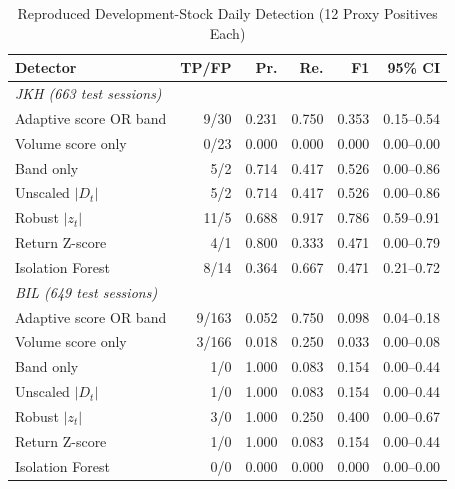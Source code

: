 \begin{table}[!t]
\caption{Reproduced Development-Stock Daily Detection (12 Proxy Positives Each)}
\label{tab:ablation}
\centering\footnotesize
\setlength{\tabcolsep}{2.7pt}
\begin{tabular}{@{}lrrrrr@{}}
\toprule
Detector & TP/FP & Pr. & Re. & F1 & 95\% CI \\
\midrule
\multicolumn{6}{l}{\textit{JKH (663 test sessions)}}\\
Adaptive score OR band & 9/30 & 0.231 & 0.750 & 0.353 & 0.15--0.54 \\
Volume score only & 0/23 & 0.000 & 0.000 & 0.000 & 0.00--0.00 \\
Band only & 5/2 & 0.714 & 0.417 & 0.526 & 0.00--0.86 \\
Unscaled $|D_t|$ & 5/2 & 0.714 & 0.417 & 0.526 & 0.00--0.86 \\
Robust $|z_t|$ & 11/5 & 0.688 & 0.917 & 0.786 & 0.59--0.91 \\
Return Z-score & 4/1 & 0.800 & 0.333 & 0.471 & 0.00--0.79 \\
Isolation Forest & 8/14 & 0.364 & 0.667 & 0.471 & 0.21--0.72 \\
\multicolumn{6}{l}{\textit{BIL (649 test sessions)}}\\
Adaptive score OR band & 9/163 & 0.052 & 0.750 & 0.098 & 0.04--0.18 \\
Volume score only & 3/166 & 0.018 & 0.250 & 0.033 & 0.00--0.08 \\
Band only & 1/0 & 1.000 & 0.083 & 0.154 & 0.00--0.44 \\
Unscaled $|D_t|$ & 1/0 & 1.000 & 0.083 & 0.154 & 0.00--0.44 \\
Robust $|z_t|$ & 3/0 & 1.000 & 0.250 & 0.400 & 0.00--0.67 \\
Return Z-score & 1/0 & 1.000 & 0.083 & 0.154 & 0.00--0.44 \\
Isolation Forest & 0/0 & 0.000 & 0.000 & 0.000 & 0.00--0.00 \\
\bottomrule
\end{tabular}

\end{table}